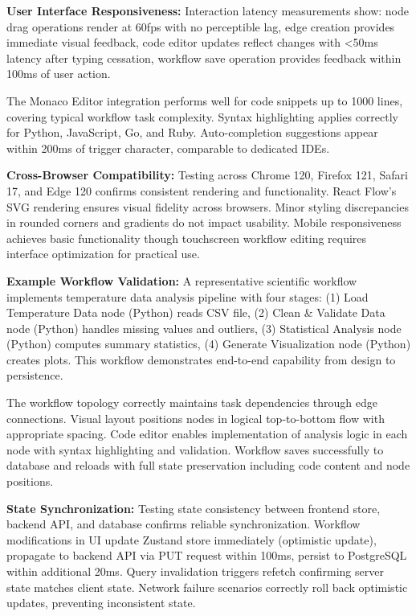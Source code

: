 \documentclass[12pt]{article}
\begin{document}
\hspace{\parindent}\textbf{User Interface Responsiveness:} Interaction latency measurements show: node drag operations render at 60fps with no perceptible lag, edge creation provides immediate visual feedback, code editor updates reflect changes with <50ms latency after typing cessation, workflow save operation provides feedback within 100ms of user action.

The Monaco Editor integration performs well for code snippets up to 1000 lines, covering typical workflow task complexity. Syntax highlighting applies correctly for Python, JavaScript, Go, and Ruby. Auto-completion suggestions appear within 200ms of trigger character, comparable to dedicated IDEs.

\hspace{\parindent}\textbf{Cross-Browser Compatibility:} Testing across Chrome 120, Firefox 121, Safari 17, and Edge 120 confirms consistent rendering and functionality. React Flow's SVG rendering ensures visual fidelity across browsers. Minor styling discrepancies in rounded corners and gradients do not impact usability. Mobile responsiveness achieves basic functionality though touchscreen workflow editing requires interface optimization for practical use.

\hspace{\parindent}\textbf{Example Workflow Validation:} A representative scientific workflow implements temperature data analysis pipeline with four stages: (1) Load Temperature Data node (Python) reads CSV file, (2) Clean \& Validate Data node (Python) handles missing values and outliers, (3) Statistical Analysis node (Python) computes summary statistics, (4) Generate Visualization node (Python) creates plots. This workflow demonstrates end-to-end capability from design to persistence.

The workflow topology correctly maintains task dependencies through edge connections. Visual layout positions nodes in logical top-to-bottom flow with appropriate spacing. Code editor enables implementation of analysis logic in each node with syntax highlighting and validation. Workflow saves successfully to database and reloads with full state preservation including code content and node positions.

\hspace{\parindent}\textbf{State Synchronization:} Testing state consistency between frontend store, backend API, and database confirms reliable synchronization. Workflow modifications in UI update Zustand store immediately (optimistic update), propagate to backend API via PUT request within 100ms, persist to PostgreSQL within additional 20ms. Query invalidation triggers refetch confirming server state matches client state. Network failure scenarios correctly roll back optimistic updates, preventing inconsistent state.
\end{document}
